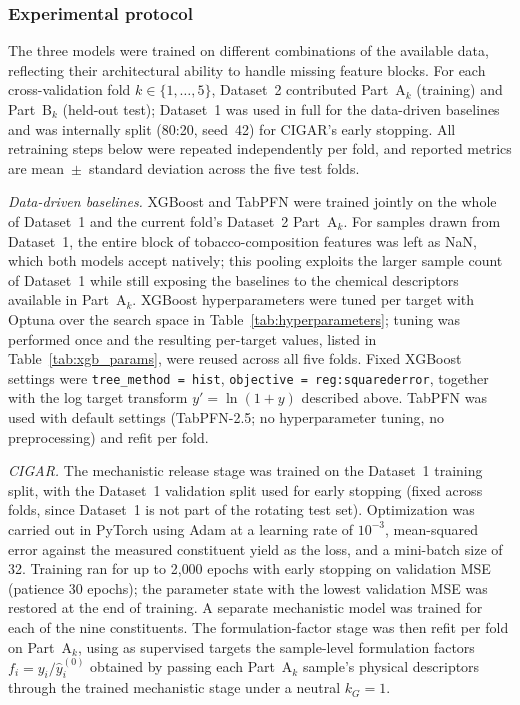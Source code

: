 \documentclass[11pt]{article}
\begin{document}
\subsubsection*{Experimental protocol}

The three models were trained on different combinations of the available
data, reflecting their architectural ability to handle missing feature
blocks. For each cross-validation fold $k\in\{1,\ldots,5\}$, Dataset~2
contributed Part~A$_k$ (training) and Part~B$_k$ (held-out test); Dataset~1
was used in full for the data-driven baselines and was internally split
(80:20, seed~42) for CIGAR's early stopping. All retraining steps below
were repeated independently per fold, and reported metrics are
mean~$\pm$~standard deviation across the five test folds.

\emph{Data-driven baselines.} XGBoost and TabPFN were trained jointly on the
whole of Dataset~1 and the current fold's Dataset~2 Part~A$_k$. For samples
drawn from Dataset~1, the entire block of tobacco-composition features was
left as NaN, which both models accept natively; this pooling exploits the
larger sample count of Dataset~1 while still exposing the baselines to the
chemical descriptors available in Part~A$_k$. XGBoost hyperparameters were
tuned per target with Optuna \cite{akiba2019optuna} over the search space
in Table~\ref{tab:hyperparameters}; tuning was performed once and the
resulting per-target values, listed in Table~\ref{tab:xgb_params}, were
reused across all five folds. Fixed XGBoost settings were
\texttt{tree\_method = hist}, \texttt{objective = reg:squarederror},
together with the log target transform $y' = \ln(1+y)$ described above.
TabPFN was used with default settings (TabPFN-2.5; no hyperparameter
tuning, no preprocessing) and refit per fold.

\emph{CIGAR.} The mechanistic release stage was trained on the Dataset~1
training split, with the Dataset~1 validation split used for early stopping
(fixed across folds, since Dataset~1 is not part of the rotating test
set). Optimization was carried out in PyTorch using Adam at a learning rate
of $10^{-3}$, mean-squared error against the measured constituent yield as
the loss, and a mini-batch size of 32. Training ran for up to 2{,}000
epochs with early stopping on validation MSE (patience 30 epochs); the
parameter state with the lowest validation MSE was restored at the end of
training. A separate mechanistic model was trained for each of the nine
constituents. The formulation-factor stage was then refit per fold on
Part~A$_k$, using as supervised targets the sample-level formulation
factors $f_i = y_i / \hat{y}_i^{(0)}$ obtained by passing each Part~A$_k$
sample's physical descriptors through the trained mechanistic stage under
a neutral $k_G = 1$.
\end{document}
